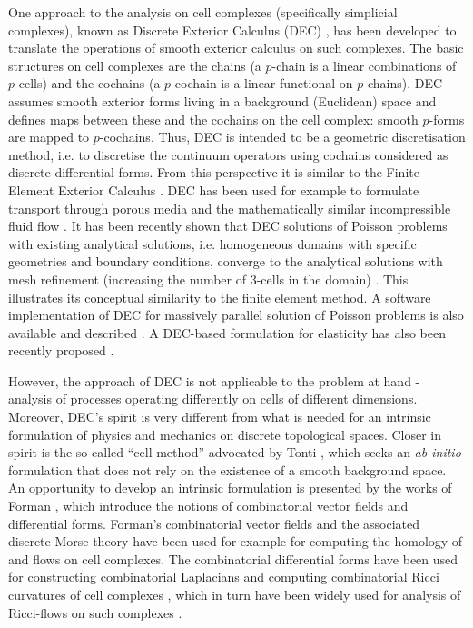 \documentclass{elsarticle}
\theoremstyle{definition}
\begin{document}
One approach to the analysis on cell complexes (specifically simplicial complexes), known as Discrete Exterior Calculus (DEC) \cite{Hirani2003_DEC}, has been developed to translate the operations of smooth exterior calculus on such complexes. The basic structures on cell complexes are the chains (a $p$-chain is a linear combinations of $p$-cells) and the cochains (a $p$-cochain is a linear functional on $p$-chains). DEC assumes smooth exterior forms living in a background (Euclidean) space and defines maps between these and the cochains on the cell complex: smooth $p$-forms are mapped to $p$-cochains. Thus, DEC is intended to be a geometric discretisation method, i.e. to discretise the continuum operators using cochains considered as discrete differential forms. From this perspective it is similar to the Finite Element Exterior Calculus \cite{Arnold2018_FEEC}. DEC has been used for example to formulate transport through porous media \cite{Hirani2015_DarcyDEC} and the mathematically similar incompressible fluid flow \cite{Mohamed2016_NavierDEC}. It has been recently shown that DEC solutions of Poisson problems with existing analytical solutions, i.e. homogeneous domains with specific geometries and boundary conditions, converge to the analytical solutions with mesh refinement (increasing the number of 3-cells in the domain) \cite{Schulz2020_DEC}. This illustrates its conceptual similarity to the finite element method. A software implementation of DEC for massively parallel solution of Poisson problems is also available and described \cite{Boom2021_Poisson}. A DEC-based formulation for elasticity has also been recently proposed \cite{Boom2022_Elasticity}.

However, the approach of DEC is not applicable to the problem at hand - analysis of processes operating differently on cells of different dimensions. Moreover, DEC's spirit is very different from what is needed for an intrinsic formulation of physics and mechanics on discrete topological spaces. Closer in spirit is the so called ``cell method'' advocated by Tonti \cite{Tonti2013_Structure}, which seeks an \emph{ab initio} formulation that does not rely on the existence of a smooth background space. An opportunity to develop an intrinsic formulation is presented by the works of Forman \cite{Forman1998_Morse, Forman2002_Novikov}, which introduce the notions of combinatorial vector fields and differential forms. Forman's combinatorial vector fields and the associated discrete Morse theory have been used for example for computing the homology of \cite{Harker2014_Morse} and flows on \cite{Mrozek2021_Flows} cell complexes. The combinatorial differential forms have been used for constructing combinatorial Laplacians and computing combinatorial Ricci curvatures of cell complexes \cite{Forman2003_Bochner, lange2005combinatorial, Watanabe2019_Ricci}, which in turn have been widely used for analysis of Ricci-flows on such complexes \cite{weber2016forman}.
\end{document}
